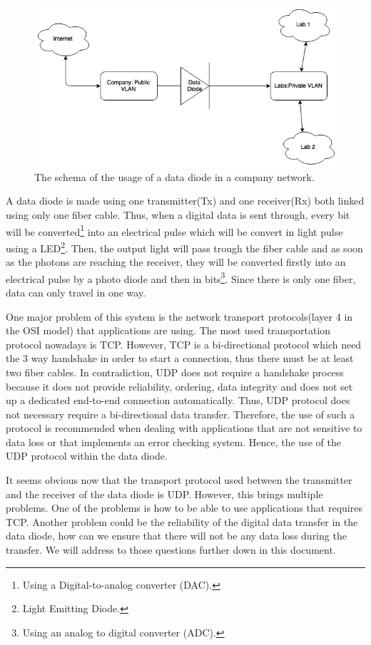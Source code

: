 \documentclass[a4paper,10pt]{article}
\begin{document}
\begin{figure}
\centering
\includegraphics[scale=0.45]{images/dataDiode.png}
\caption{The schema of the usage of a data diode in a company network.}
\label{fig:datadiode}
\end{figure}

A data diode is made using one transmitter(Tx) and one receiver(Rx) both linked using only one fiber cable. Thus, when a digital data is sent through, every bit will be converted\footnote{Using a Digital-to-analog converter (DAC).} into an electrical pulse which will be convert in light pulse using a LED\footnote{Light Emitting Diode.}. Then, the output light will pass trough the fiber cable and as soon as the photons are reaching the receiver, they will be converted firstly into an electrical pulse by a photo diode and then in bits\footnote{Using an analog to digital converter (ADC).}. Since there is only one fiber, data can only travel in one way.

One major problem of this system is the network transport protocols(layer 4 in the OSI model) that applications are using. The most used transportation protocol nowadays is TCP. However, TCP is a bi-directional protocol which need the 3 way handshake in order to start a connection, thus there must be at least two fiber cables. In contradiction, UDP does not require a handshake process because it does not provide reliability, ordering, data integrity and does not set up a dedicated end-to-end connection automatically. Thus, UDP protocol does not necessary require a bi-directional data transfer. Therefore, the use of such a protocol is recommended when dealing with applications that are not sensitive to data loss or that implements an error checking system. Hence, the use of the UDP protocol within the data diode.

It seems obvious now that the transport protocol used between the transmitter and the receiver of the data diode is UDP. However, this brings multiple problems. One of the problems is how to be able to use applications that requires TCP. Another problem could be the reliability of the digital data transfer in the data diode, how can we ensure that there will not be any data loss during the transfer. We will address to those questions further down in this document.\bigskip
\end{document}
